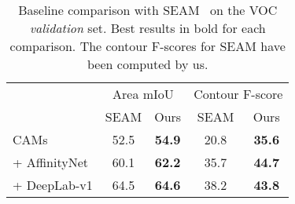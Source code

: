 \documentclass{article}
\begin{document}
\begin{table}[p]
	\setlength\abovecaptionskip{0pt}
	\centering
	\caption{Baseline comparison with SEAM~\cite{wang2020cvpr} on the VOC \textit{validation} set. Best results in bold for each comparison. The contour F-scores for SEAM have been computed by us.}
	\begin{tabular}{lcccc}
		\toprule
		& \multicolumn{2}{c}{Area mIoU} & \multicolumn{2}{c}{Contour F-score} \\
		\cmidrule(r){2-3}
		\cmidrule(r){4-5}
		& SEAM & Ours & SEAM & Ours \\
		\midrule
		CAMs          & 52.5 & \textbf{54.9} & 20.8 & \textbf{35.6} \\
		+ AffinityNet & 60.1 & \textbf{62.2} & 35.7 & \textbf{44.7} \\
		+ DeepLab-v1  & 64.5 & \textbf{64.6} & 38.2 & \textbf{43.8} \\
		\bottomrule
	\end{tabular}
	\label{table_baseline_comparison}
\end{table}
\end{document}
